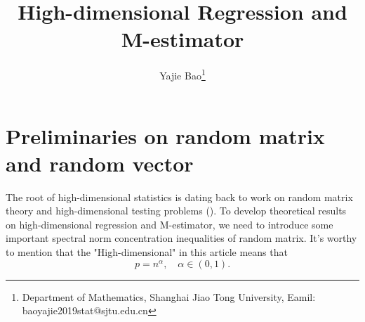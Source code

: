 \documentclass[12pt]{article}
\numberwithin{equation}{section}
\begin{document}
\title{High-dimensional Regression and M-estimator}

\author{Yajie Bao\thanks{Department of Mathematics, Shanghai Jiao Tong University, Eamil: baoyajie2019stat@sjtu.edu.cn}}
\maketitle
\section{Preliminaries on random matrix and random vector}
The root of high-dimensional statistics is dating back to work on random matrix theory and high-dimensional testing problems (\citet{negahban2012unified}). To develop theoretical results on high-dimensional regression and M-estimator, we need to introduce some important spectral norm concentration inequalities of random matrix. It's worthy to mention that the "High-dimensional" in this article means that
$$
p=n^{\alpha},\quad \alpha\in (0,1).
$$
\end{document}
